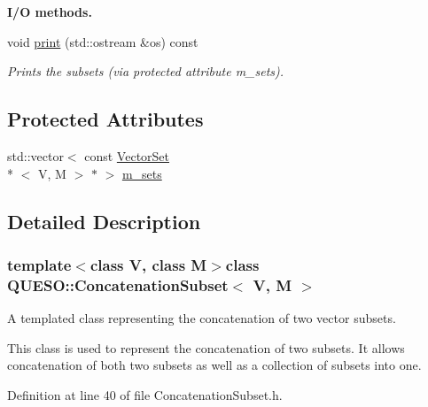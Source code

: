\begin{Indent}{\bf I/\-O methods.}\par
\begin{DoxyCompactItemize}
\item 
void \hyperlink{class_q_u_e_s_o_1_1_concatenation_subset_ae574a1733853d2a0df31ca83dd083061}{print} (std\-::ostream \&os) const 
\begin{DoxyCompactList}\small\item\em Prints the subsets (via protected attribute m\-\_\-sets). \end{DoxyCompactList}\end{DoxyCompactItemize}
\end{Indent}
\subsection*{Protected Attributes}
\begin{DoxyCompactItemize}
\item 
std\-::vector$<$ const \hyperlink{class_q_u_e_s_o_1_1_vector_set}{Vector\-Set}\\*
$<$ V, M $>$ $\ast$ $>$ \hyperlink{class_q_u_e_s_o_1_1_concatenation_subset_ab318a754dbb4b2a8be6f5d94a6e4c2dd}{m\-\_\-sets}
\end{DoxyCompactItemize}


\subsection{Detailed Description}
\subsubsection*{template$<$class V, class M$>$class Q\-U\-E\-S\-O\-::\-Concatenation\-Subset$<$ V, M $>$}

A templated class representing the concatenation of two vector subsets. 

This class is used to represent the concatenation of two subsets. It allows concatenation of both two subsets as well as a collection of subsets into one. 

Definition at line 40 of file Concatenation\-Subset.\-h.



